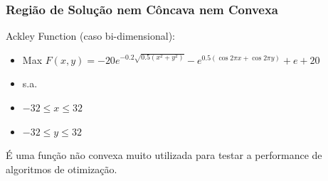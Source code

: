 \documentclass{beamer}
\begin{document}
\begin{frame}
	\frametitle{Região de Solução nem Côncava nem Convexa}
	\centering
	\begin{alertblock}{Ackley Function (caso bi-dimensional):}
		\begin{itemize}
		\item[] Max $F(x,y) = -20e^{-0.2\sqrt{0.5(x^2+y^2)}} - e^{0.5(\cos 2 \pi x + \cos 2 \pi y)} + e + 20$
		\item[] s.a.
		\item[] $ -32 \le x \le 32$
		\item[] $ -32 \le y \le 32$
		\end{itemize}
	\end{alertblock}	
	É uma função não convexa muito utilizada para testar a performance de algoritmos de otimização.
\end{frame}
\end{document}
